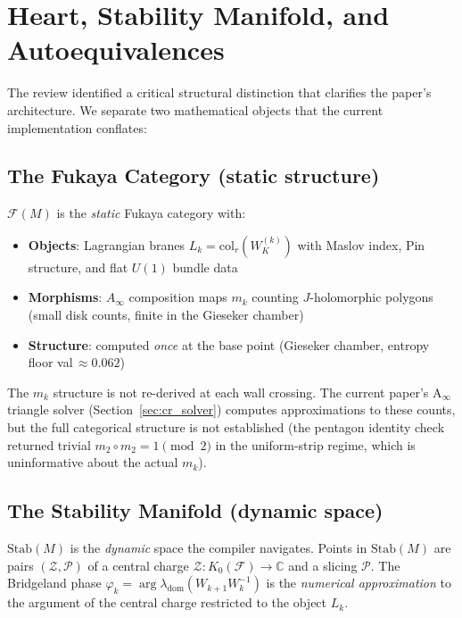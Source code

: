 \documentclass[11pt]{amsart}
\begin{document}
\section{Heart, Stability Manifold, and Autoequivalences}
\label{sec:heart_stab}

The review identified a critical structural distinction that clarifies
the paper's architecture.
We separate two mathematical objects that the current implementation
conflates:

\subsection{The Fukaya Category (static structure)}

$\mathcal{F}(M)$ is the \emph{static} Fukaya category with:
\begin{itemize}
\item \textbf{Objects}: Lagrangian branes $L_k = \mathrm{col}_r(W_K^{(k)})$
  with Maslov index, Pin structure, and flat $U(1)$ bundle data
\item \textbf{Morphisms}: $A_\infty$ composition maps $m_k$ counting
  $J$-holomorphic polygons (small disk counts, finite in the Gieseker chamber)
\item \textbf{Structure}: computed \emph{once} at the base point
  (Gieseker chamber, entropy floor val\,$\approx 0.062$)
\end{itemize}

The $m_k$ structure is not re-derived at each wall crossing.
The current paper's A$_\infty$ triangle solver
(Section~\ref{sec:cr_solver}) computes approximations to these counts,
but the full categorical structure is not established
(the pentagon identity check returned trivial $m_2 \circ m_2 = 1 \pmod{2}$
in the uniform-strip regime, which is uninformative about the actual $m_k$).

\subsection{The Stability Manifold (dynamic space)}

$\mathrm{Stab}(M)$ is the \emph{dynamic} space the compiler navigates.
Points in $\mathrm{Stab}(M)$ are pairs $(\mathcal{Z}, \mathcal{P})$
of a central charge $\mathcal{Z}: K_0(\mathcal{F}) \to \mathbb{C}$
and a slicing $\mathcal{P}$.
The Bridgeland phase $\varphi_k = \arg\lambda_\mathrm{dom}(W_{k+1}W_k^{-1})$
is the \emph{numerical approximation} to the argument of the central charge
restricted to the object $L_k$.
\end{document}
